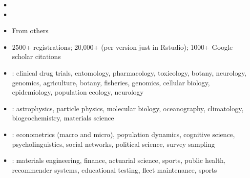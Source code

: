 \documentclass[10pt]{report}
\begin{document}
%
\begin{itemize}
\item {}
\item {}
\item From others
\end{itemize}
\vfill


%
\begin{itemize}
\item 2500+  registrations;  20,000+ 
  \small{(per version just in Rstudio)}; 1000+ Google scholar citations
\item {}: {\footnotesize
clinical drug trials, entomology, pharmacology, toxicology, botany,
neurology, genomics, agriculture, botany, fisheries, genomics, cellular
biology, epidemiology, population ecology, neurology
}
\item {}: {\footnotesize
astrophysics, particle physics, molecular biology, oceanography, climatology, biogeochemistry, materials science
}
\item {}: {\footnotesize
 econometrics (macro and micro), population dynamics, cognitive
 science, psycholinguistics, social networks, political science,
 survey sampling
}
\item {}: {\footnotesize materials engineering, finance,
    actuarial science, sports, public health, recommender systems,
    educational testing, fleet maintenance, sports}
\end{itemize}
\end{document}
